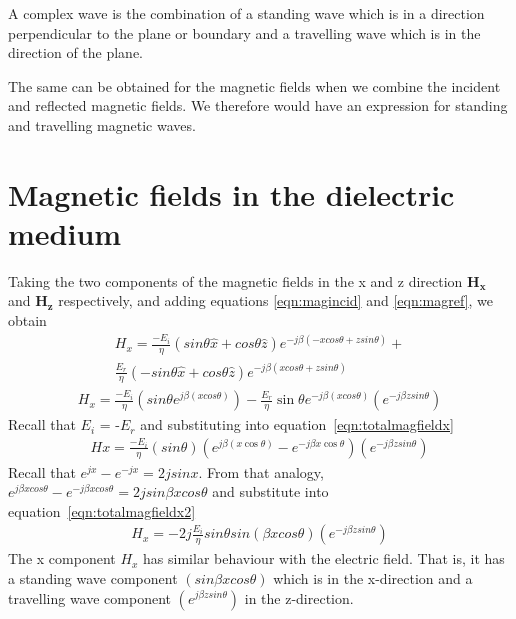 A complex wave is the combination of a standing wave which is in a direction perpendicular to the plane or boundary and a travelling wave which is in the direction of the plane.

The same can be obtained for the magnetic fields when we combine the incident and reflected magnetic fields. We therefore
would have an expression for standing and travelling magnetic waves.

\section{Magnetic fields in the dielectric medium}
Taking the two components of the magnetic fields in the x and z direction
$\boldsymbol{H_x}$ and $\boldsymbol{H_z}$ respectively, and adding equations \ref{eqn:magincid} and \ref{eqn:magref}, we obtain
\begin{align*}
H_x = \frac{-E_i}{\eta} (sin\theta \hat{x} + cos\theta \hat{z}) e^{-j\beta( -xcos\theta + zsin\theta)} +\\ 
\frac{E_r}{\eta} \left(-sin\theta \hat{x} + cos\theta \hat{z}\right) e^{-j\beta( xcos\theta + zsin\theta)}
\end{align*}
\begin{align}
H_x = \frac{-E_i}{\eta}(sin\theta e^{j\beta( xcos\theta)} ) - \frac{E_r}{\eta}\sin\theta e^{-j\beta( xcos\theta)} (e^{-j\beta zsin\theta})
\label{eqn:totalmagfieldx}
\end{align}
Recall that $E_i$ = -$E_r$ and substituting into equation~\ref{eqn:totalmagfieldx}
\begin{align}
Hx = \frac{-E_i}{\eta}(sin\theta)( e^{j\beta( x\cos\theta)} - e^{-j\beta x\cos\theta}) (e^{-j\beta zsin\theta})
\label{eqn:totalmagfieldx2}
\end{align}
Recall that $e^{jx} - e^{-jx} = 2jsinx$. From that analogy, $e^{j\beta xcos\theta} - e^{-j\beta xcos\theta} = 2jsin\beta xcos\theta$ and substitute into
equation~\eqref{eqn:totalmagfieldx2}
\begin{align}
H_x =  -2j \frac{E_i}{\eta}sin\theta sin(\beta xcos\theta)(e^{-j\beta zsin\theta})
\end{align} 
The x component $H_x$ has similar behaviour with the electric field. That is, it has a standing wave component $(sin\beta xcos\theta)$ which is in the x-direction and a travelling wave component $(e^{j\beta zsin\theta})$ in the z-direction.

